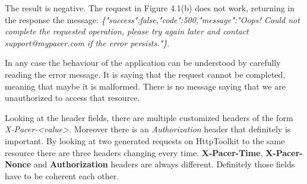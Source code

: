 			\par The result is negative. The request in Figure 4.1(b) does not work, returning in the response the message: \newline
			\textit{\{"success":false,"code":500,"message":"Oops! Could not complete the requested operation, please try again later and contact support@mypacer.com if the error persists."\}}. \newline
			\par In any case the behaviour of the application can be understood by carefully reading the error message. It is saying that the request cannot be completed, meaning that maybe it is malformed. There is no message saying that we are unauthorized to access that resource.
			\par Looking at the header fields, there are multiple customized headers of the form \textit{X-Pacer-<value>}. Moreover there is an \textit{Authorization} header that definitely is important. By looking at two generated requests on HttpToolkit to the same resource there are three headers changing every time. \textbf{X-Pacer-Time}, \textbf{X-Pacer-Nonce} and \textbf{Authorization} headers are always different. Definitely those fields have to be coherent each other. 
			
